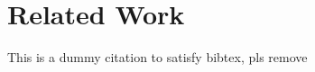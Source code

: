 \section{Related Work}

This is a dummy citation to satisfy bibtex, pls remove \cite{dummyCitation}
